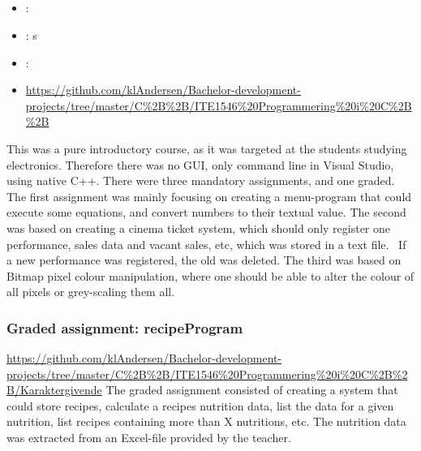 \label{sec:section3}

\subsection[C++ course]{}
\label{sec:cpp_programming}
\begin{itemize} 
	\item {}: 
	\item {}: s
	\item {}: 
	\item {} \url{https://github.com/klAndersen/Bachelor-development-projects/tree/master/C%2B%2B/ITE1546%20Programmering%20i%20C%2B%2B}
\end{itemize} 
This was a pure introductory course, as it was targeted at the students studying electronics. 
Therefore there was no GUI, only command line in Visual Studio, using native C++.
There were three mandatory assignments, and one graded. 
\vspace{0.5em}\newline
The first assignment was mainly focusing on creating a menu-program that could execute some equations, and convert numbers to their textual value. 
The second was based on creating a cinema ticket system, which should only register one performance, sales data and vacant sales, etc, which was stored in a text file. 
If a new performance was registered, the old was deleted. 
The third was based on Bitmap pixel colour manipulation, where one should be able to alter the colour of all pixels or grey-scaling them all.

\subsubsection{Graded assignment: recipeProgram} %
\label{sec:recipe_program}
 \url{https://github.com/klAndersen/Bachelor-development-projects/tree/master/C%2B%2B/ITE1546%20Programmering%20i%20C%2B%2B/Karaktergivende}
The graded assignment consisted of creating a system that could store recipes, calculate a recipes nutrition data, list the data for a given nutrition, 
list recipes containing more than X nutritions, etc. 
The nutrition data was extracted from an Excel-file provided by the teacher.

